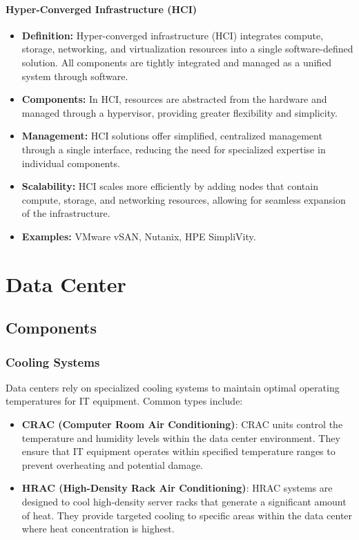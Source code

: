 \documentclass[a4paper,12pt]{report}
\begin{document}
\paragraph{Hyper-Converged Infrastructure (HCI)}
\begin{itemize}
	\item \textbf{Definition:} Hyper-converged infrastructure (HCI) integrates compute, storage, networking, and virtualization resources into a single software-defined solution. All components are tightly integrated and managed as a unified system through software.
	\item \textbf{Components:} In HCI, resources are abstracted from the hardware and managed through a hypervisor, providing greater flexibility and simplicity.
	\item \textbf{Management:} HCI solutions offer simplified, centralized management through a single interface, reducing the need for specialized expertise in individual components.
	\item \textbf{Scalability:} HCI scales more efficiently by adding nodes that contain compute, storage, and networking resources, allowing for seamless expansion of the infrastructure.
	\item \textbf{Examples:} VMware vSAN, Nutanix, HPE SimpliVity.
\end{itemize}


	
	\section{Data Center}
	
	\subsection{Components}
	
	\subsubsection{Cooling Systems}
	Data centers rely on specialized cooling systems to maintain optimal operating temperatures for IT equipment. Common types include:
	
	\begin{itemize}
		\item \textbf{CRAC (Computer Room Air Conditioning)}: CRAC units control the temperature and humidity levels within the data center environment. They ensure that IT equipment operates within specified temperature ranges to prevent overheating and potential damage.
		\item \textbf{HRAC (High-Density Rack Air Conditioning)}: HRAC systems are designed to cool high-density server racks that generate a significant amount of heat. They provide targeted cooling to specific areas within the data center where heat concentration is highest.
	\end{itemize}
	
\end{document}
